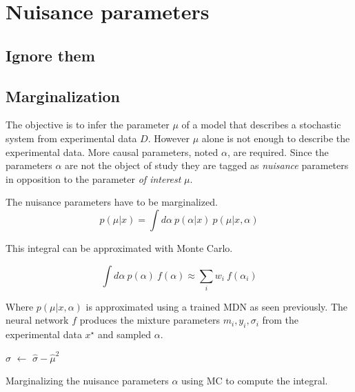 \section{Nuisance parameters} %
\label{sec:nuisance_parameters}



\subsection{Ignore them} %
\label{sub:ignore_them}





\subsection{Marginalization} %
\label{sub:marginalization}


The objective is to infer the parameter $\mu$ of a model that describes a stochastic system from experimental data $D$.
However $\mu$ alone is not enough to describe the experimental data.
More causal parameters, noted $\alpha$, are required.
Since the parameters $\alpha$ are not the object of study they are tagged as \emph{nuisance} parameters in opposition to the parameter \emph{of interest} $\mu$.

The nuisance parameters have to be marginalized.
\begin{equation}
    p(\mu | x) = \int d\alpha ~ p(\alpha | x) ~ p(\mu | x, \alpha)
\end{equation}

This integral can be approximated with Monte Carlo.

\begin{equation}
  \int d\alpha ~ p(\alpha) ~ f(\alpha)
  \approx \sum_i w_i ~ f(\alpha_i)
\end{equation}

Where $p(\mu | x, \alpha)$ is approximated using a trained MDN as seen previously.
The neural network $f$ produces the mixture parameters $m_i, y_i, \sigma_i$ from the experimental data $x^\star$ and sampled $\alpha$.

\begin{algorithm}[H]
$\hat\sigma$  $\gets$ $\hat\sigma - \hat\mu^2$ \;
\caption{Marginalizing the nuisance parameters $\alpha$ using MC to compute the integral.}
\end{algorithm}





